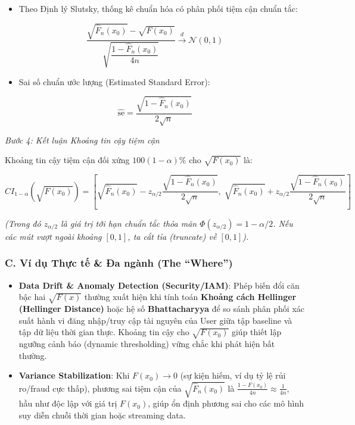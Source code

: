 \documentclass[12pt,a4paper]{article}
\begin{document}
\begin{itemize}

\item
  Theo Định lý Slutsky, thống kê chuẩn hóa có phân phối tiệm cận chuẩn tắc:
\end{itemize}

\[\frac{\sqrt{\widehat{F}_n(x_0)} - \sqrt{F(x_0)}}{\sqrt{\dfrac{1 - \widehat{F}_n(x_0)}{4n}}} \xrightarrow{d} \mathcal{N}(0, 1)\]

\begin{itemize}

\item
  Sai số chuẩn ước lượng (Estimated Standard Error):
\end{itemize}

\[\widehat{\text{se}} = \frac{\sqrt{1 - \widehat{F}_n(x_0)}}{2\sqrt{n}}\]

\emph{Bước 4: Kết luận Khoảng tin cậy tiệm cận}

Khoảng tin cậy tiệm cận đối xứng \(100(1-\alpha)\%\) cho \(\sqrt{F(x_0)}\) là:

\[CI_{1-\alpha}\left(\sqrt{F(x_0)}\right) = \left[ \sqrt{\widehat{F}_n(x_0)} - z_{\alpha/2} \frac{\sqrt{1 - \widehat{F}_n(x_0)}}{2\sqrt{n}}, \; \sqrt{\widehat{F}_n(x_0)} + z_{\alpha/2} \frac{\sqrt{1 - \widehat{F}_n(x_0)}}{2\sqrt{n}} \right]\]

\emph{(Trong đó \(z_{\alpha/2}\) là giá trị tới hạn chuẩn tắc thỏa mãn \(\Phi(z_{\alpha/2}) = 1 - \alpha/2\). Nếu các mút vượt ngoài khoảng \([0, 1]\), ta cắt tỉa (truncate) về \([0, 1]\)).}

\subsubsection{C. Ví dụ Thực tế \& Đa ngành (The ``Where'')}\label{c.-vuxed-dux1ee5-thux1ef1c-tux1ebf-ux111a-nguxe0nh-the-where}

\begin{itemize}

\item
  \textbf{Data Drift \& Anomaly Detection (Security/IAM)}: Phép biến đổi căn bậc hai \(\sqrt{F(x)}\) thường xuất hiện khi tính toán \textbf{Khoảng cách Hellinger (Hellinger Distance)} hoặc hệ số \textbf{Bhattacharyya} để so sánh phân phối xác suất hành vi đăng nhập/truy cập tài nguyên của User giữa tập baseline và tập dữ liệu thời gian thực. Khoảng tin cậy cho \(\sqrt{F(x_0)}\) giúp thiết lập ngưỡng cảnh báo (dynamic thresholding) vững chắc khi phát hiện bất thường.
\item
  \textbf{Variance Stabilization}: Khi \(F(x_0) \to 0\) (sự kiện hiếm, ví dụ tỷ lệ rủi ro/fraud cực thấp), phương sai tiệm cận của \(\sqrt{\widehat{F}_n(x_0)}\) là \(\frac{1 - F(x_0)}{4n} \approx \frac{1}{4n}\), hầu như độc lập với giá trị \(F(x_0)\), giúp ổn định phương sai cho các mô hình suy diễn chuỗi thời gian hoặc streaming data.
\end{itemize}
\end{document}
